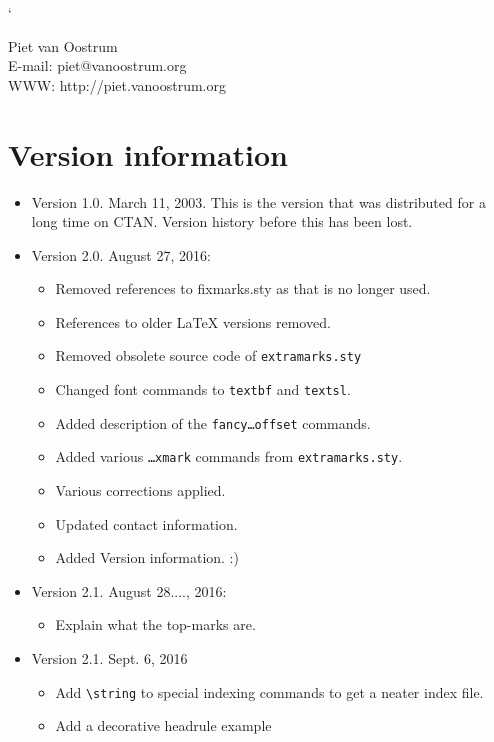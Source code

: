`\documentclass[a4paper]{article}
\newcommand{\bs}{\symbol{'134}}
\newcommand{\Cmd}[1]{\texttt{\def\{{\char`\{}\def\}{\char`\}}\bs#1}}
\begin{document}
Piet van Oostrum\\
E-mail: piet@vanoostrum.org \\
WWW: http://piet.vanoostrum.org

\section{Version information}
\begin{itemize}
\item  Version 1.0. March 11,  2003. This is the version that was distributed for a 
  long time on CTAN. Version history before this has been lost. 
\item Version 2.0. August 27, 2016:
  \begin{itemize}
  \item Removed references to fixmarks.sty as that is no longer used.
  \item References to older \LaTeX{} versions removed.
  \item Removed obsolete source code of \texttt{extramarks.sty}
  \item Changed font commands to \Cmd{textbf} and \Cmd{textsl}.
  \item Added description of the \Cmd{fancy\ldots offset} commands.
  \item Added various \Cmd{\ldots xmark} commands from \texttt{extramarks.sty}.
  \item Various corrections applied.
  \item Updated contact information.
  \item Added Version information. :)
  \end{itemize}
\item Version 2.1. August 28...., 2016:
  \begin{itemize}
  \item Explain what the top-marks are.
  \end{itemize}
\item Version 2.1. Sept. 6, 2016
  \begin{itemize}
  \item Add \verb|\string| to special indexing commands to get a neater index file.
  \item Add a decorative headrule example
  \end{itemize}

\end{itemize}

\printindex
\end{document}
